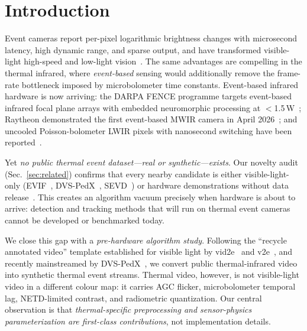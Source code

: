 \section{Introduction}
\label{sec:intro}

Event cameras report per-pixel logarithmic brightness changes with
microsecond latency, high dynamic range, and sparse output, and have
transformed visible-light high-speed and low-light
vision~\cite{rebecq2018esim,gehrig2020vid2e}. The same advantages are
compelling in the thermal infrared, where \emph{event-based} sensing would
additionally remove the frame-rate bottleneck imposed by microbolometer
time constants. Event-based infrared hardware is now arriving: the DARPA
FENCE programme targets event-based infrared focal plane arrays with
embedded neuromorphic processing at $<$1.5\,W~\cite{fence}; Raytheon
demonstrated the first event-based MWIR camera in April
2026~\cite{raytheon2026}; and uncooled Poisson-bolometer LWIR pixels with
nanosecond switching have been reported~\cite{mousa2026poisson,neuralbolometers2026}.

Yet \emph{no public thermal event dataset---real or synthetic---exists}. Our
novelty audit (Sec.~\ref{sec:related}) confirms that every nearby candidate
is either visible-light-only (EVIF~\cite{geng2024evif},
DVS-PedX~\cite{sakhai2026dvspedx}, SEVD~\cite{sevd}) or hardware
demonstrations without data release~\cite{raytheon2026,mousa2026poisson}.
This creates an algorithm vacuum precisely when hardware is about to
arrive: detection and tracking methods that will run on thermal event
cameras cannot be developed or benchmarked today.

We close this gap with a \emph{pre-hardware algorithm study}. Following the
``recycle annotated video'' template established for visible light by
vid2e~\cite{gehrig2020vid2e} and v2e~\cite{hu2021v2e}, and recently
mainstreamed by DVS-PedX~\cite{sakhai2026dvspedx}, we convert public
thermal-infrared video into synthetic thermal event streams. Thermal video,
however, is not visible-light video in a different colour map: it carries
AGC flicker, microbolometer temporal lag, NETD-limited contrast, and
radiometric quantization. Our central observation is that
\emph{thermal-specific preprocessing and sensor-physics parameterization are
first-class contributions}, not implementation details.

